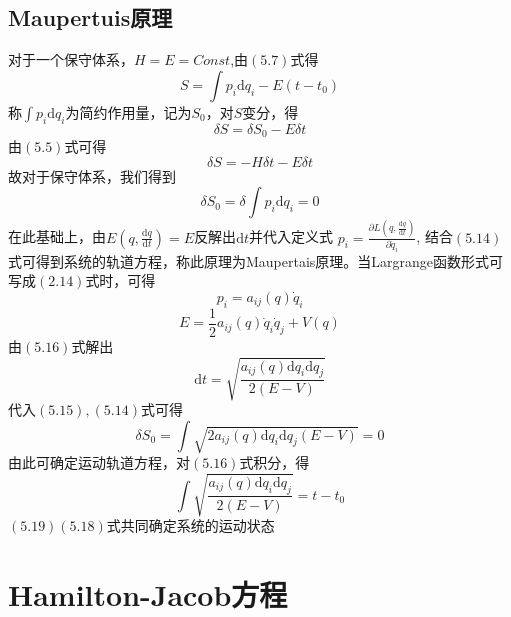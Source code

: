 \section{Maupertuis原理}
对于一个保守体系，$H=E=Const$,由$(5.7)$式得
\begin{equation}
    S=\int p_i\mathrm{d}q_i-E(t-t_0)
\end{equation}
称$\int p_i\mathrm{d}q_i$为简约作用量，记为$S_0$，对$S$变分，得
\begin{equation}
    \delta S=\delta S_0-E\delta t
\end{equation}
由$(5.5)$式可得
\begin{equation}
    \delta S=-H\delta t-E\delta t
\end{equation}
故对于保守体系，我们得到
\begin{equation}
    \delta S_0=\delta\int p_i\mathrm{d}q_i=0
\end{equation}
在此基础上，由$\displaystyle{E\left(q,\frac{\mathrm{d}q}{\mathrm{d}t}\right)=E}$反解出$\mathrm{d}t$并代入定义式
$\displaystyle{p_i=\frac{\partial L(q,\frac{\mathrm{d}q}{\mathrm{d}t})}{\partial \dot{q}_i}}$,
结合$(5.14)$式可得到系统的轨道方程，称此原理为Maupertais原理。当Largrange函数形式可写成$(2.14)$式时，可得
\begin{equation}
    p_i=a_{ij}(q)\dot{q}_i
\end{equation}
\begin{equation}
    E=\frac{1}{2}a_{ij}(q)\dot{q}_i\dot{q}_j+V(q)
\end{equation}
由$(5.16)$式解出
\begin{equation}
    \mathrm{d}t=\sqrt{\frac{a_{ij}(q)\mathrm{d}q_i\mathrm{d}q_j}{2(E-V)}}
\end{equation}
代入$(5.15),(5.14)$式可得
\begin{equation}
    \delta S_0=\int\sqrt{2a_{ij}(q)\mathrm{d}q_i\mathrm{d}q_j(E-V)}=0
\end{equation}
由此可确定运动轨道方程，对$(5.16)$式积分，得
\begin{equation}
    \int\sqrt{\frac{a_{ij}(q)\mathrm{d}q_i\mathrm{d}q_j}{2(E-V)}}=t-t_0
\end{equation}
$(5.19)(5.18)$式共同确定系统的运动状态
\chapter{\rm Hamilton-Jacob方程}
